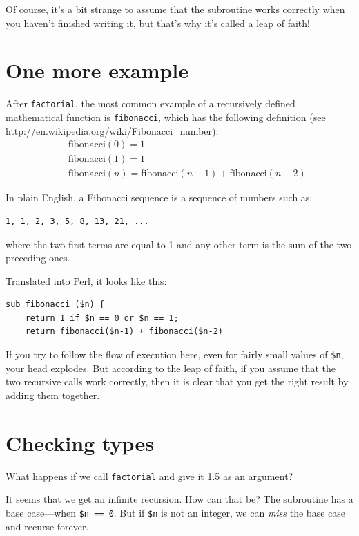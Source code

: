 Of course, it's a bit strange to assume that the subroutine works
correctly when you haven't finished writing it, but that's why
it's called a leap of faith!


\section{One more example}
\label{one.more.example}

After {\tt factorial}, the most common example of a recursively
defined mathematical function is {\tt fibonacci}, which has the
following definition (see
  \url{http://en.wikipedia.org/wiki/Fibonacci_number}):
%
\begin{eqnarray*}
&& \mathrm{fibonacci}(0) = 1 \\
&& \mathrm{fibonacci}(1) = 1 \\
&& \mathrm{fibonacci}(n) = \mathrm{fibonacci}(n-1) + \mathrm{fibonacci}(n-2)
\end{eqnarray*}
%

In plain English, a Fibonacci sequence is a sequence of numbers 
such as:
\begin{verbatim}
1, 1, 2, 3, 5, 8, 13, 21, ...
\end{verbatim}
where the two first terms are equal to 1 and any other term is the 
sum of the two preceding ones.

Translated into Perl, it looks like this:

\begin{verbatim}
sub fibonacci ($n) {
    return 1 if $n == 0 or $n == 1;
    return fibonacci($n-1) + fibonacci($n-2)
\end{verbatim}
%
If you try to follow the flow of execution here, even for fairly
small values of \verb'$n', your head explodes.  But according to the
leap of faith, if you assume that the two recursive calls
work correctly, then it is clear that you get
the right result by adding them together.


\section{Checking types}
\label{guardian}

What happens if we call {\tt factorial} and give it 1.5 as an argument?

It seems that we get an infinite recursion.  How can that be? 
The subroutine has a base case---when {\tt \$n == 0}.  But if {\tt \$n} 
is not an integer, we can {\em miss} the base case and recurse forever.

